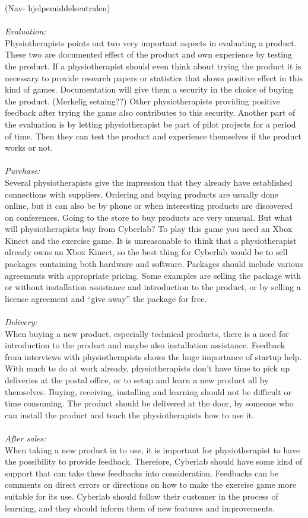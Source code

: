  (Nav- hjelpemiddelsentralen)\\ \\
\emph{Evaluation:}\\
Physiotherapists points out two very important aspects in evaluating a product. These two are documented effect of the product and own experience by testing the product. If a physiotherapist should even think about trying the product it is necessary to provide research papers or statistics that shows positive effect in this kind of games. Documentation will give them a security in the choice of buying the product. (Merkelig setning??) Other physiotherapists providing positive feedback after trying the game also contributes to this security. Another part of the evaluation is by letting physiotherapist be part of pilot projects for a period of time. Then they can test the product and experience themselves if the product works or not.\\ \\
\emph{Purchase:} \\
Several physiotherapists give the impression that they already have established connections with suppliers. Ordering and buying products are usually done online, but it can also be by phone or when interesting products are discovered on conferences. Going to the store to buy products are very unusual. But what will physiotherapists buy from Cyberlab? To play this game you need an Xbox Kinect and the exercise game. It is unreasonable to think that a physiotherapist already owns an Xbox Kinect, so the best thing for Cyberlab would be to sell packages containing both hardware and software.  Packages should include various agreements with appropriate pricing. Some examples are selling the package with or without installation assistance and introduction to the product, or by selling a license agreement and “give away” the package for free.\\ \\
\emph{Delivery:}\\
 When buying a new product, especially technical products, there is a need for introduction to the product and maybe also installation assistance. Feedback from interviews with physiotherapists shows the huge importance of startup help. With much to do at work already, physiotherapists don’t have time to pick up deliveries at the postal office, or to setup and learn a new product all by themselves. Buying, receiving, installing and learning should not be difficult or time consuming. The product should be delivered at the door, by someone who can install the product and teach the physiotherapists how to use it.\\ \\
\emph{After sales:}\\
When taking a new product in to use, it is important for physiotherapist to have the possibility to provide feedback. Therefore, Cyberlab should have some kind of support that can take these feedbacks into consideration. Feedbacks can be comments on direct errors or directions on how to make the exercise game more suitable for its use. Cyberlab should follow their customer in the process of learning, and they should inform them of new features and improvements.  
